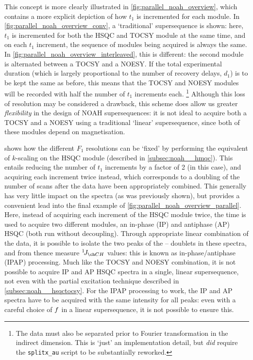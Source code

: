 This concept is more clearly illustrated in \cref{fig:parallel_noah_overview}, which contains a more explicit depiction of how $t_1$ is incremented for each module.
In \cref{fig:parallel_noah_overview_conv}, a `traditional'  supersequence is shown: here, $t_1$ is incremented for both the HSQC and TOCSY module at the same time, and on each $t_1$ increment, the sequence of modules being acquired is always the same.
In \cref{fig:parallel_noah_overview_interleaved}, this is different: the second module is alternated between a TOCSY and a NOESY.
If the total experimental duration (which is largely proportional to the number of recovery delays, $d_1$) is to be kept the same as before, this means that the TOCSY and NOESY modules will be recorded with half the number of $t_1$ increments each.%
\footnote{The data must also be separated prior to Fourier transformation in the indirect dimension. This is `just' an implementation detail, but \textit{did} require the \texttt{splitx\_au} script to be substantially reworked.}
Although this loss of resolution may be considered a drawback, this scheme does allow us greater \textit{flexibility} in the design of NOAH supersequences: it is not ideal to acquire both a TOCSY and a NOESY using a traditional `linear' supersequence, since both of these modules depend on  magnetisation.

 shows how the different $F_1$ resolutions can be `fixed' by performing the equivalent of $k$-scaling on the HSQC module (described in \cref{subsec:noah__hmqc}).
This entails reducing the number of $t_1$ increments by a factor of 2 (in this case), and acquiring each increment twice instead, which corresponds to a doubling of the number of scans after the data have been appropriately combined.
This generally has very little impact on the spectra (as was previously shown), but provides a convenient lead into the final example of \cref{fig:parallel_noah_overview_parallel}.
Here, instead of acquiring each increment of the HSQC module twice, the time is used to acquire two different modules, an in-phase (IP) and antiphase (AP) HSQC (both run without \carbon{} decoupling).
Through appropriate linear combination of the data, it is possible to isolate the two peaks of the \proton{}--\carbon{} doublets in these spectra, and from thence measure $\oneJ{CH}$ values: this is known as in-phase/antiphase (IPAP) processing.\autocite{Ottiger1998JMR,Nolis2006JMR,Enthart2008JMR,Gil2010JMR}
Much like the TOCSY and NOESY combination, it is not possible to acquire IP and AP HSQC spectra in a single, linear supersequence, not even with the partial  excitation technique described in \cref{subsec:noah__hsqctocsy}.
For the IPAP processing to work, the IP and AP spectra have to be acquired with the same intensity for all peaks: even with a careful choice of $f\/$ in a linear supersequence, it is not possible to ensure this.

